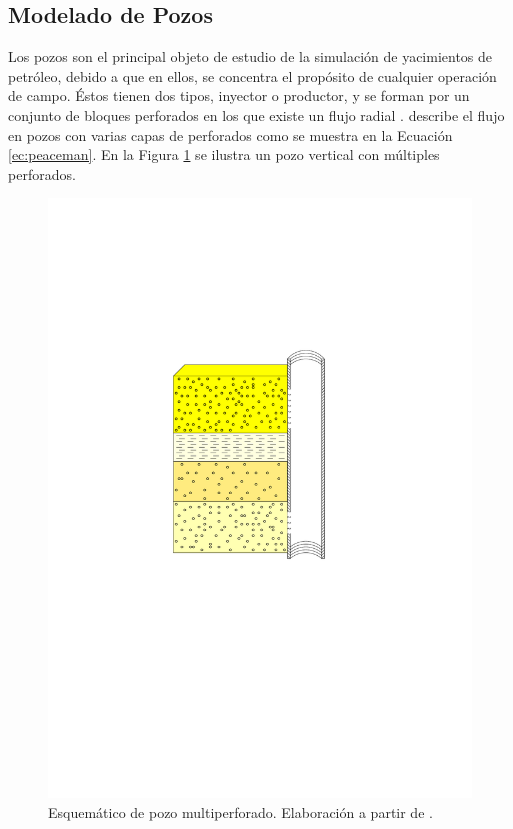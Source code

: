 \subsection{Modelado de Pozos}
%
Los pozos son el principal objeto de estudio de la simulación de yacimientos de petróleo, debido a que en ellos, se concentra el propósito de cualquier operación de campo. Éstos tienen dos tipos, inyector o productor, y se forman por un conjunto de bloques perforados en los que existe un flujo radial \citep{peaceman1983interpretation}. \cite{peaceman1983interpretation} describe el flujo en pozos con varias capas de perforados como se muestra en la Ecuación \ref{ec:peaceman}. En la Figura \ref{fig:mulperfwell} se ilustra un pozo vertical con múltiples perforados.

\begin{figure}[h]
	\centering%
	\includegraphics[scale=0.8]{Fig/pozo_multi_perf.pdf}%
	\caption[Esquemático de pozo multiperforado.]{Esquemático de pozo multiperforado. Elaboración a partir de \cite{chen2007reservoir}.} \label{fig:mulperfwell}
\end{figure}
